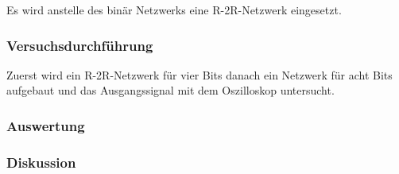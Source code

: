 \documentclass[12pt,a4paper]{article}
\begin{document}
Es wird anstelle des binär Netzwerks eine R-2R-Netzwerk eingesetzt.

\subsubsection*{Versuchsdurchführung}

Zuerst wird ein R-2R-Netzwerk für vier Bits danach ein Netzwerk für acht Bits aufgebaut und das Ausgangssignal mit dem Oszilloskop untersucht.

\subsubsection*{Auswertung}
\subsubsection*{Diskussion}
\end{document}
